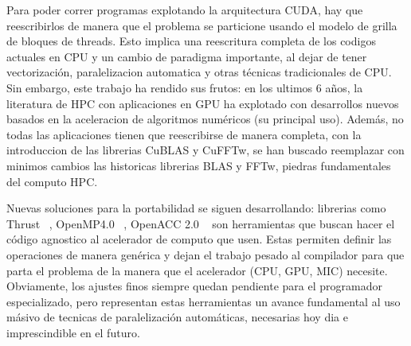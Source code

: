 Para poder correr programas explotando la arquitectura CUDA, hay que reescribirlos de manera que
el problema se particione usando el modelo de grilla de bloques de threads. Esto implica una
reescritura completa de los codigos actuales en CPU y un cambio de paradigma importante, al
dejar de tener vectorizaci\'on, paralelizacion automatica y otras t\'ecnicas tradicionales
de CPU. Sin embargo, este trabajo ha rendido sus frutos: en los ultimos 6 a\~nos, la literatura
de HPC con aplicaciones en GPU ha explotado con desarrollos nuevos basados en la aceleracion
de algoritmos num\'ericos (su principal uso).%
Adem\'as, no todas las aplicaciones tienen que reescribirse de manera completa, con la introduccion
de las librerias CuBLAS y CuFFTw, se han buscado reemplazar con minimos cambios las historicas
librerias BLAS y FFTw, piedras fundamentales del computo HPC. %

Nuevas soluciones para la portabilidad se siguen desarrollando: librerias como Thrust ~\cite{thrust},
OpenMP4.0 ~\cite{spec_omp40}, OpenACC 2.0 ~\cite{spec_oacc2.0} son herramientas que buscan hacer el
c\'odigo agnostico al acelerador de computo que usen. Estas permiten definir las operaciones de
manera gen\'erica y dejan el trabajo pesado al compilador para que parta el problema de la manera
que el acelerador (CPU, GPU, MIC) necesite. Obviamente, los ajustes finos siempre quedan pendiente para
el programador especializado, pero representan estas herramientas un avance fundamental al uso
m\'asivo de tecnicas de paralelizaci\'on autom\'aticas, necesarias hoy dia e imprescindible en el
futuro.
